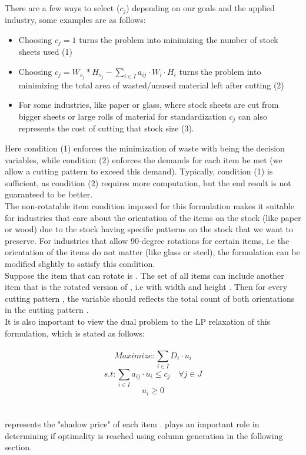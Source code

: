 \documentclass[a4paper]{article}
\begin{document}
    \vspace{0.2cm}\\
    There are a few ways to select \boldmath($c_j$) depending on our goals and the applied industry, some examples are as follows:
    \begin{itemize}
        \item Choosing \( c_j = 1\) turns the problem into minimizing the number of stock sheets used (1)
        \item Choosing \( c_j = W_{s_j} * H_{s_j} - \sum_{i \in I} a_{ij} \cdot W_i \cdot H_i   \)  turns the problem into minimizing the total area of wasted/unused material left after cutting (2)
        \item For some industries, like paper or glass, where stock sheets are cut from bigger sheets or large rolls of material for standardization \( c_j \)  can also represents the cost of cutting that stock size (3). 
    \end{itemize}

    \noindent
    Here condition (1) enforces the minimization of waste with  being the decision variables, 
    while condition (2) enforces the demands for each item be met (we allow a cutting pattern to exceed this demand). Typically, condition (1) is sufficient, as condition (2) requires more computation, but the end result is not guaranteed to be better. 
    \vspace{0.2cm}\\
    The non-rotatable item condition imposed for this formulation makes it suitable for industries that care about the orientation of the items on the stock (like paper or wood) due to the stock having specific patterns on the stock that we want to preserve. For industries that allow 90-degree rotations for certain items, i.e the orientation of the items do not matter (like glass or steel), the formulation can be modified slightly to satisfy this condition.
    \vspace{0.2cm}\\    
    Suppose the item that can rotate is .
    The set of all items  can include another item that is the rotated version of , i.e with width  and height . Then for every cutting pattern , the variable  should reflects the total count of both orientations in the cutting pattern . 
    \vspace{0.2cm}\\
    It is also important to view the dual problem to the LP relaxation of this formulation, which is stated as follows:
    \\ \\
    \[ Maximize: \sum_{i \in I} D_i \cdot u_i\]
    \[ s.t:  \sum_{i \in I} a_{ij} \cdot u_i \leqslant c_j \quad \forall j \in J\]
    \[  u_i \geqslant 0 \]
    \\ \\
     represents the "shadow price" of each item .  plays an important role in determining if optimality is reached using column generation in the following section.
    \pagebreak
\end{document}
